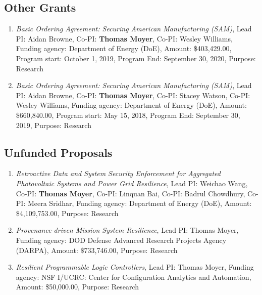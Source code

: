 
\setcounter{subsection}{5} %
\hypertarget{other-grants}{%
\subsection{Other Grants}\label{other-grants}}

\begin{enumerate}
\item \textit{Basic Ordering Agreement: Securing American Manufacturing (SAM)}, Lead PI: Aidan Browne, Co-PI: \textbf{Thomas Moyer}, Co-PI: Wesley Williams, Funding agency: Department of Energy (DoE), Amount: \$403,429.00, Program start: October 1, 2019, Program End: September 30, 2020, Purpose: Research
\item \textit{Basic Ordering Agreement: Securing American Manufacturing (SAM)}, Lead PI: Aidan Browne, Co-PI: \textbf{Thomas Moyer}, Co-PI: Stacey Watson, Co-PI: Wesley Williams, Funding agency: Department of Energy (DoE), Amount: \$660,840.00, Program start: May 15, 2018, Program End: September 30, 2019, Purpose: Research
\end{enumerate}

\hypertarget{unfunded-proposals}{%
\subsection{Unfunded Proposals}\label{unfunded-proposals}}

\begin{enumerate}
\item \textit{Retroactive Data and System Security Enforcement for Aggregated Photovoltaic Systems and Power Grid Resilience}, Lead PI: Weichao Wang, Co-PI: \textbf{Thomas Moyer}, Co-PI: Linquan Bai, Co-PI: Badrul Chowdhury, Co-PI: Meera Sridhar, Funding agency: Department of Energy (DoE), Amount: \$4,109,753.00, Purpose: Research
\item \textit{Provenance-driven Mission System Resilience}, Lead PI: Thomas Moyer, Funding agency: DOD Defense Advanced Research Projects Agency (DARPA), Amount: \$733,746.00, Purpose: Research
\item \textit{Resilient Programmable Logic Controllers}, Lead PI: Thomas Moyer, Funding agency: NSF I/UCRC: Center for Configuration Analytics and Automation, Amount: \$50,000.00, Purpose: Research
\end{enumerate}
